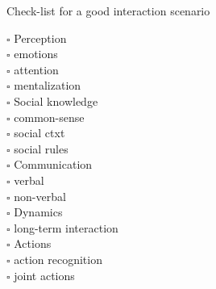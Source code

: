 \documentclass[compress]{beamer}
\begin{document}
\begin{frame}{Check-list for a good interaction scenario}
\begin{multicols}{2}
        \begin{multicols}{2}
            $\square$ Perception\\
            {\tiny
                \hspace*{0.4cm}$\square$ emotions\\
                \hspace*{0.4cm}$\square$ attention\\
                \hspace*{0.4cm}$\square$ mentalization\\
            }
            $\square$ Social knowledge\\
            {\tiny
                \hspace*{0.4cm}$\square$ common-sense\\
                \hspace*{0.4cm}$\square$ social ctxt\\
                \hspace*{0.4cm}$\square$ social rules\\
            }
            \vfill
            \columnbreak
            $\square$ Communication\\
            {\tiny
                \hspace*{0.4cm}$\square$ verbal\\
                \hspace*{0.4cm}$\square$ non-verbal\\
            }
            $\square$ Dynamics\\
            {\tiny
                \hspace*{0.2cm}$\square$ long-term interaction\\
            }
            $\square$ Actions\\
            {\tiny
                \hspace*{0.4cm}$\square$ action recognition\\
                \hspace*{0.4cm}$\square$ joint actions\\
            }
        \end{multicols}




    \end{multicols}

\end{frame}
\end{document}

